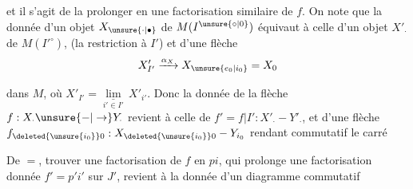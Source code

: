 
et il s'agit de la prolonger en une factorisation similaire de $f$. On note que la donnée d'un objet $X_{\unsure{\cdot|\bullet}}$ de $M(I^{\unsure{\circ|0}})$ équivaut à celle d'un objet $X'_{\cdot}$ de $M(I'^\circ)$, (la restriction  à $I'$) et d'une flèche
\[
 X'_{I'}\xrightarrow{\alpha_X}X_{\unsure{e_0|i_0}}=X_0
\]

dans $M$, où $X'_{I'}=\underset{i'\in I'}{\underline{\lim}}\,X'_{i'}$. Donc la donnée de la flèche $f:X_{\cdot}\unsure{\mathbin{-}|\to}Y_{\cdot}$ revient à celle de $f'=f|I':X'_{\cdot}\mathbin{-}Y'_{\cdot}$, et d'une flèche $f_{\deleted{\unsure{i_0}}0}:X_{\deleted{\unsure{i_0}}0}\mathbin{-}Y_{i_0}$ rendant commutatif le carré


De $=$, trouver une factorisation de $f$ en $pi$, qui prolonge une factorisation donnée $f'=p'i'$ sur $J'$, revient à la donnée d'un diagramme commutatif

